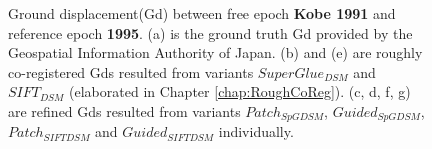 \begin{figure}[htbp]
\begin{center}
{\begin{minipage}[t]{1\linewidth}
			\end{minipage}%
		}
		
		\caption{Ground displacement(Gd) between free epoch \textbf{Kobe 1991} and reference epoch \textbf{1995}. (a) is the ground truth Gd provided by the Geospatial Information Authority of Japan. (b) and (e) are roughly co-registered Gds resulted from variants $SuperGlue_{DSM}$ and $SIFT_{DSM}$ (elaborated in Chapter \ref{chap:RoughCoReg}). (c, d, f, g) are refined Gds resulted from variants $Patch_{SpGDSM}$, $Guided_{SpGDSM}$, $Patch_{SIFTDSM}$ and $Guided_{SIFTDSM}$ individually.}
		\label{GdKobe}
	\end{center}
\end{figure} 

